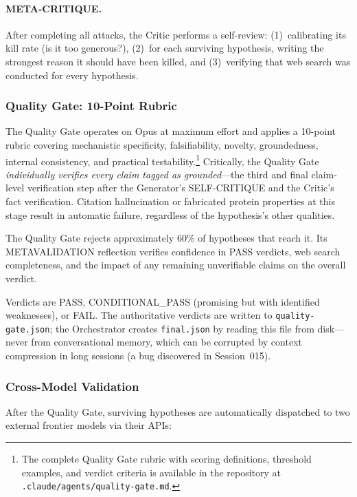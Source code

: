 \paragraph{META-CRITIQUE.} After completing all attacks, the Critic performs a self-review: (1)~calibrating its kill rate (is it too generous?), (2)~for each surviving hypothesis, writing the strongest reason it should have been killed, and (3)~verifying that web search was conducted for every hypothesis.

\subsubsection{Quality Gate: 10-Point Rubric}

The Quality Gate operates on Opus at maximum effort and applies a 10-point rubric covering mechanistic specificity, falsifiability, novelty, groundedness, internal consistency, and practical testability.\footnote{The complete Quality Gate rubric with scoring definitions, threshold examples, and verdict criteria is available in the repository at \texttt{.claude/agents/quality-gate.md}.} Critically, the Quality Gate \emph{individually verifies every claim tagged as grounded}---the third and final claim-level verification step after the Generator's SELF-CRITIQUE and the Critic's fact verification. Citation hallucination or fabricated protein properties at this stage result in automatic failure, regardless of the hypothesis's other qualities.

The Quality Gate rejects approximately 60\% of hypotheses that reach it. Its META\-VA\-LI\-DA\-TION reflection verifies confidence in PASS verdicts, web search completeness, and the impact of any remaining unverifiable claims on the overall verdict.

Verdicts are PASS, CONDITIONAL\_PASS (promising but with identified weaknesses), or FAIL. The authoritative verdicts are written to \texttt{quality-gate.json}; the Orchestrator creates \texttt{final.json} by reading this file from disk---never from conversational memory, which can be corrupted by context compression in long sessions (a bug discovered in Session~015).

\subsubsection{Cross-Model Validation}

After the Quality Gate, surviving hypotheses are automatically dispatched to two external frontier models via their APIs:

